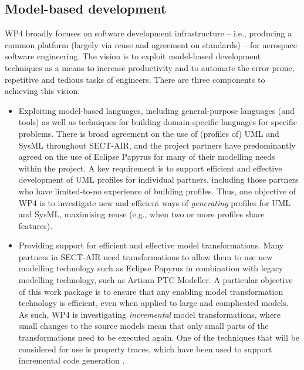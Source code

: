\subsection{Model-based development}
WP4 broadly focuses on software development infrastructure -- i.e., producing a common platform (largely via reuse and agreement on standards) -- for aerospace
software engineering. The vision is to exploit model-based development techniques as a means to increase productivity and to automate the error-prone, repetitive
and tedious tasks of engineers. There are three components to achieving this vision:
\begin{itemize}
\item Exploiting model-based languages, including general-purpose languages (and tools) as well as techniques for building domain-specific languages for specific problems. 
There is broad agreement on the use of (profiles of) UML and SysML throughout SECT-AIR, and the project partners have predominantly agreed on the use of Eclipse
Papyrus for many of their modelling needs within the project. A key requirement is to support efficient and effective development of UML profiles for individual partners,
including those partners who have limited-to-no experience of building profiles. Thus, one objective of WP4 is to investigate new and efficient ways of \textit{generating}
profiles for UML and SysML, maximising reuse (e.g., when two or more profiles share features).

\item Providing support for efficient and effective model transformations. Many partners in SECT-AIR need transformations to allow them to use new modelling
technology such as Eclipse Papyrus in combination with legacy modelling technology, such as Artisan PTC Modeller. A particular objective of this work package is to
ensure that any enabling model transformation technology is efficient, even when applied to large and complicated models. As such, WP4 is investigating 
\textit{incremental} model transformations, where small changes to the source models mean that only small parts of the transformations need to be executed
again. One of the techniques that will be considered for use is property traces, which have been used to support incremental code generation \cite{OgunyomiRK15}.



\end{itemize}
